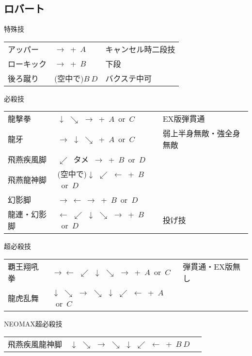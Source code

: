 \documentclass[a4j,11pt]{jarticle}
\def\hien{$\swarrow$\ タメ\ $\rightarrow$}
\def\hado{$\downarrow$ $\searrow$ $\rightarrow$}%
\def\tatsu{$\downarrow$ $\swarrow$ $\leftarrow$}%
\def\syoryu{$\rightarrow$ $\downarrow$ $\searrow$}%
\def\yoga{$\leftarrow$ $\swarrow$ $\downarrow$ $\searrow$ $\rightarrow$}%
\def\ryuko{$\downarrow$ $\searrow$ $\rightarrow$ $\searrow$ $\downarrow$ $\swarrow$ $\leftarrow$}%
\begin{document}
\subsection{ロバート}
\begin{itembox}[l]{特殊技}
\begin{tabular}{lll}
アッパー&$\rightarrow$\ +\ $A$&キャンセル時二段技\\%
ローキック&$\rightarrow$\ +\ $B$&下段\\%
後ろ蹴り&(空中で)$B\ D$&バクステ中可%
\end{tabular}
\end{itembox}
\begin{itembox}[l]{必殺技}
\begin{tabular}{lll}
龍撃拳&\hado\ +\ $A$\ or\ $C$&EX版弾貫通\\%
龍牙&\syoryu\ +\ $A$\ or\ $C$&弱上半身無敵・強全身無敵\\%
飛燕疾風脚&\hien\ +\ $B$\ or\ $D$&\\%
飛燕龍神脚&(空中で)\tatsu\ +\ $B$\ or\ $D$&\\%
幻影脚&$\rightarrow\ \leftarrow\ \rightarrow$\ +\ $B$\ or\ $D$&\\%
龍連・幻影脚&\yoga\ +\ $B$\ or\ $D$&投げ技%
\end{tabular}
\end{itembox}
\begin{itembox}[l]{超必殺技}
\begin{tabular}{lll}
覇王翔吼拳&$\rightarrow$\yoga\ +\ $A$\ or\ $C$&弾貫通・EX版無し\\%
龍虎乱舞&\ryuko\ +\ $A$\ or\ $C$&%
\end{tabular}
\end{itembox}
\begin{itembox}[l]{NEOMAX超必殺技}
\begin{tabular}{lll}
飛燕疾風龍神脚&\ryuko\ +\ $B\ D$&%
\end{tabular}
\end{itembox}
\newpage
\end{document}
